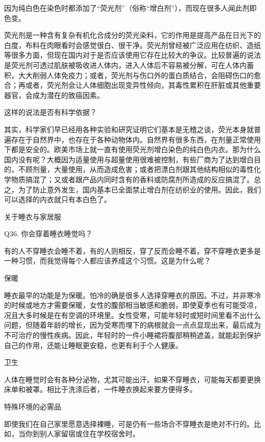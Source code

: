 \documentclass[12pt,UTF8]{ctexbook}
\begin{document}
因为纯白色在染色时都添加了“荧光剂”（俗称“增白剂”），而现在很多人闻此剂即色变。

荧光剂是一种含有复杂有机化合成分的荧光染料，它的作用是提高产品在日光下的白度，布料在肉眼看时会感觉很白、很干净。荧光剂曾经被广泛应用在纺织、造纸等很多方面，但现在国内对于是否应该使用它存在比较大的争议。比较普遍的说法是荧光剂可透过肌肤被吸收进人体内，进入人体后不容易被分解，可在人体内蓄积，大大削弱人体免疫力；或者，荧光剂与伤口外的蛋白质结合，会阻碍伤口的愈合；再或者，荧光剂会让人体细胞出现变异性倾向，其毒性累积在肝脏或其他重要器官，会成为潜在的致癌因素。

这样的说法是否有科学依据？

其实，科学家们早已经用各种实验和研究证明它们基本是无稽之谈，荧光本身就普遍存在于自然界中，也存在于各种动物体内。自然界有很多东西，在剂量正常使用下都是安全的。欧美市场上就一直有使用荧光剂增白染色的纯白色内衣。那为什么国内没有呢？大概因为适量使用与超量使用很难被控制，有些厂商为了达到增白目的，不顾剂量，大量使用，从而造成危害；或者把漂白剂跟其他结构相似的毒性化学物质搞混了；又或者跟产品内同时含有的香料或防腐剂所造成的反应搞混了。总之，为了防止意外发生，国内基本已全面禁止增白剂在纺织业的使用。因此，我们可以选择的内衣就只有本白色了。





关于睡衣与家居服


Q36. 你会穿着睡衣睡觉吗？


有的人不穿睡衣会睡不着，有的人则相反，穿了反而会睡不着。穿不穿睡衣更多是一种习惯，而我觉得每个人都应该养成这个习惯。这是为什么呢？

保暖

睡衣最早的功能是为保暖。怕冷的确是很多人选择穿睡衣的原因。不过，并非寒冷的时候或地方才需要保暖，女性的腹部相当敏感和脆弱，即使夏季也有可能受凉，况且大多时候是在有空调的环境里。女性受寒，可能年轻时或短时间里看不出什么问题，但随着年龄的增长，因为受寒而埋下的病根就会一点点显现出来，最后成为不可治疗的慢性疾病。因此，年轻时的一件小睡裙将腹部稍稍遮盖，就能起到保护自己的作用，还能让睡眠更安稳，也更有利于个人健康。

卫生

人体在睡觉时会有各种分泌物，尤其可能出汗。如果不穿睡衣，可能每天都要更换床单和被罩。相比于洗涤后者，一件睡衣换起来要方便得多。

特殊环境的必需品

即使我们在自己家里愿意选择裸睡，可是仍有一些场合不穿睡衣是绝对不行的。比如，当你到别人家留宿或住在学校宿舍时。
\end{document}
